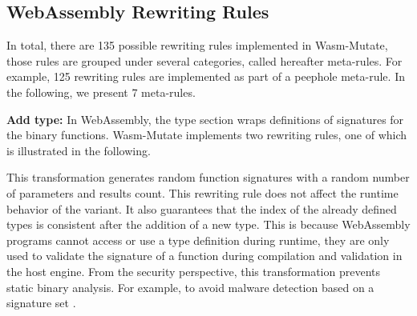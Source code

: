 \documentclass[a4paper,fleqn]{cas-dc}
\newcommand*\badge[1]{ \colorbox{red}{\color{white}#1}}
\newcommand{\tool}{{\sc Wasm-Mutate}\xspace}
\newcommand{\todo}[1]{%
\refstepcounter{todo}
\noindent\textbf{\badge{TODO}} {\color{red}#1}
\addcontentsline{td}{todo}
{\color{red}\thesection.\thetodo\xspace #1}}
\begin{document}




\subsection{WebAssembly Rewriting Rules}

% 


In total, there are 135 possible rewriting rules implemented in \tool, those rules are grouped under several categories, called hereafter meta-rules.
For example, 125 rewriting rules are implemented as part of a peephole meta-rule.
In the following, we present 7 meta-rules.

\textbf{Add type:}
In WebAssembly, the type section wraps definitions of signatures for the binary functions.
\tool implements two rewriting rules, one of which is illustrated in the following. 



This transformation generates random function signatures with a random number of parameters and results count.
This rewriting rule does not affect the runtime behavior of the variant.
It also guarantees that the index of the already defined types is consistent after the addition of a new type. This is because WebAssembly programs cannot access or use a type definition during runtime, they are only used to validate the signature of a function during compilation and validation in the host engine.
From the security perspective, this transformation prevents static binary analysis. 
For example, to avoid malware detection based on a signature set \cite{CABRERAARTEAGA2023103296}.
\end{document}
